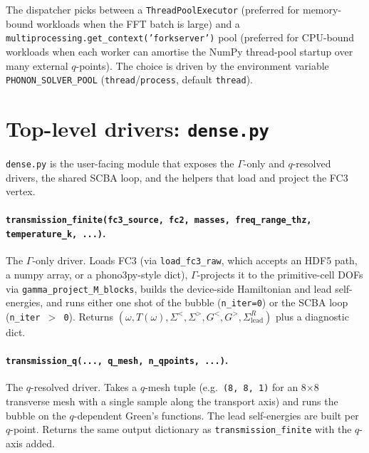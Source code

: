 The dispatcher picks between a \texttt{ThreadPoolExecutor} (preferred
for memory-bound workloads when the FFT batch is large) and a
\texttt{multiprocessing.get\_context('forkserver')} pool (preferred
for CPU-bound workloads when each worker can amortise the
NumPy thread-pool startup over many external $q$-points).  The choice
is driven by the environment variable \texttt{PHONON\_SOLVER\_POOL}
(\texttt{thread}/\texttt{process}, default \texttt{thread}).

\section{Top-level drivers: \texttt{dense.py}}
\label{sec:dense_driver}

\texttt{dense.py} is the user-facing module that exposes the
$\Gamma$-only and $q$-resolved drivers, the shared SCBA loop, and the
helpers that load and project the FC3 vertex.

\paragraph{\texttt{transmission\_finite(fc3\_source, fc2, masses,
freq\_range\_thz, temperature\_k, ...)}.}  The $\Gamma$-only driver.
Loads FC3 (via \texttt{load\_fc3\_raw}, which accepts an HDF5 path, a
numpy array, or a phono3py-style dict), $\Gamma$-projects it to the
primitive-cell DOFs via \texttt{gamma\_project\_M\_blocks}, builds the
device-side Hamiltonian and lead self-energies, and runs either one
shot of the bubble (\texttt{n\_iter=0}) or the SCBA loop
(\texttt{n\_iter $>$ 0}).  Returns
$(\omega, T(\omega), \Sigma^<, \Sigma^>, G^<, G^>, \Sigma^R_\mathrm{lead})$
plus a diagnostic dict.

\paragraph{\texttt{transmission\_q(..., q\_mesh, n\_qpoints, ...)}.}
The $q$-resolved driver.  Takes a $q$-mesh tuple (e.g.\
\texttt{(8, 8, 1)} for an 8$\times$8 transverse mesh with a single
sample along the transport axis) and runs the bubble on the
$q$-dependent Green's functions.  The lead self-energies are built
per $q$-point.  Returns the same output dictionary as
\texttt{transmission\_finite} with the $q$-axis added.

